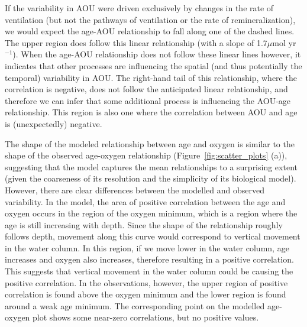 If the variability in AOU were driven exclusively by changes in the rate of
ventilation (but not the pathways of ventilation or the rate of remineralization),
we would expect the age-AOU relationship to fall along one of the dashed lines.
The upper region does follow this linear relationship (with a slope of
1.7$\mu$mol yr$^{-1}$). When the age-AOU relationship does not follow these linear
lines however, it indicates that other processes are influencing the spatial
(and thus potentially the temporal) variability in AOU. The right-hand tail of
this relationship, where the correlation is negative, does not follow the
anticipated linear relationship, and therefore we can infer that some additional
process is influencing the AOU-age relationship. This region is also one where
the correlation between AOU and age is (unexpectedly) negative.

The shape of the modeled relationship between age and oxygen is similar to the
shape of the observed age-oxygen relationship (Figure~\ref{fig:scatter_plots} (a)),
suggesting that the model captures the mean relationships to a surprising extent
(given the coarseness of its resolution and the simplicity of its biological model).
However, there are clear differences between the modelled and observed variability.
In the model, the area of positive correlation between the age and oxygen occurs
in the region of the oxygen minimum, which is a region where the age is still
increasing with depth. Since the shape of the relationship roughly follows depth,
movement along this curve would correspond to vertical movement in the water column.
In this region, if we move lower in the water column, age increases and oxygen also
increases, therefore resulting in a positive correlation. This suggests that vertical
movement in the water column could be causing the positive correlation. In the
observations, however, the upper region of positive correlation is found above the
oxygen minimum and the lower region is found around a weak age minimum. The
corresponding point on the modelled age-oxygen plot shows some near-zero correlations,
but no positive values.

